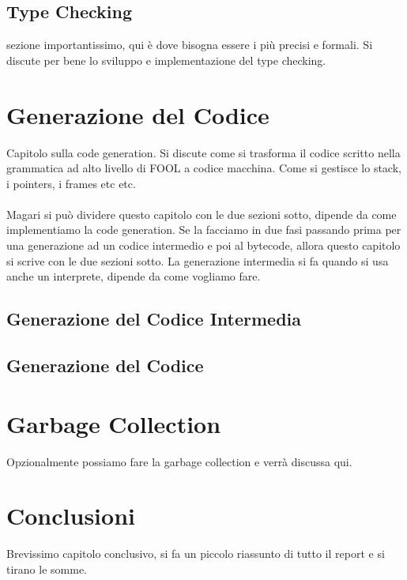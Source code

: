 \documentclass{scrreprt}
\begin{document}
\section{Type Checking}
sezione importantissimo, qui è dove bisogna essere i più precisi e formali. Si discute per bene lo sviluppo
e implementazione del type checking.

\chapter{Generazione del Codice}
Capitolo sulla code generation. Si discute come si trasforma il codice scritto nella grammatica
ad alto livello di FOOL a codice macchina. Come si gestisce lo stack, i pointers, i frames etc etc.\\
\\
Magari si può dividere questo capitolo con le due sezioni sotto, dipende da come implementiamo la code 
generation. Se la facciamo in due fasi passando prima per una generazione ad un codice intermedio e 
poi al bytecode, allora questo capitolo si scrive con le due sezioni sotto.
La generazione intermedia si fa quando si usa anche un interprete, dipende da come vogliamo fare.
\section{Generazione del Codice Intermedia}
\section{Generazione del Codice}

\chapter{Garbage Collection}
Opzionalmente possiamo fare la garbage collection e verrà discussa qui.

\chapter{Conclusioni}
Brevissimo capitolo conclusivo, si fa un piccolo riassunto di tutto il report e si tirano le somme.
\end{document}
